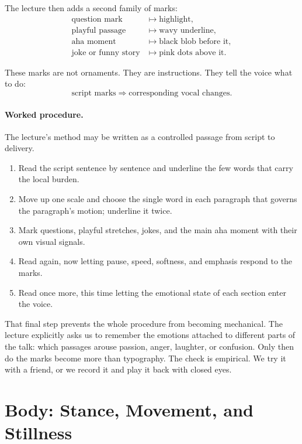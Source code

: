 The lecture then adds a second family of marks:
\begin{align}
\text{question mark} &\mapsto \text{highlight}, \\
\text{playful passage} &\mapsto \text{wavy underline}, \\
\text{aha moment} &\mapsto \text{black blob before it}, \\
\text{joke or funny story} &\mapsto \text{pink dots above it}.
\end{align}

These marks are not ornaments. They are instructions. They tell the voice what to do:
\begin{equation}
\text{script marks} \Longrightarrow \text{corresponding vocal changes}.
\end{equation}

\paragraph{Worked procedure.} The lecture's method may be written as a controlled passage from script to delivery.
\begin{enumerate}
\item Read the script sentence by sentence and underline the few words that carry the local burden.
\item Move up one scale and choose the single word in each paragraph that governs the paragraph's motion; underline it twice.
\item Mark questions, playful stretches, jokes, and the main aha moment with their own visual signals.
\item Read again, now letting pause, speed, softness, and emphasis respond to the marks.
\item Read once more, this time letting the emotional state of each section enter the voice.
\end{enumerate}

That final step prevents the whole procedure from becoming mechanical. The lecture explicitly asks us to remember the emotions attached to different parts of the talk: which passages arouse passion, anger, laughter, or confusion. Only then do the marks become more than typography. The check is empirical. We try it with a friend, or we record it and play it back with closed eyes.

\section{Body: Stance, Movement, and Stillness}

